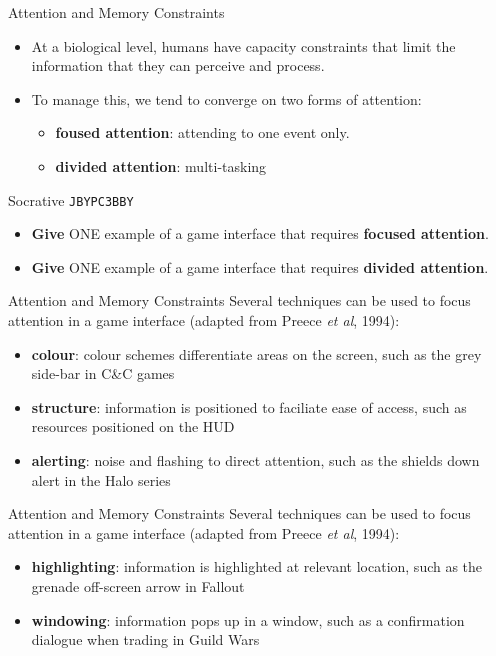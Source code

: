\begin{frame}{Attention and Memory Constraints}
	\begin{itemize}
		\item At a biological level, humans have capacity constraints that limit the information that they can perceive and process.
		\item To manage this, we tend to converge on two forms of attention:
		\begin{itemize}
			\item \textbf{foused attention}: attending to one event only.
			\item \textbf{divided attention}: multi-tasking
		\end{itemize}	
	\end{itemize}
\end{frame}

\begin{frame}[fragile]{Socrative \texttt{JBYPC3BBY}}
	\begin{itemize}
		\item \textbf{Give} ONE example of a game interface that requires \textbf{focused attention}.
		\item \textbf{Give} ONE example of a game interface that requires \textbf{divided attention}.
	\end{itemize}
\end{frame}

\begin{frame}{Attention and Memory Constraints}
	Several techniques can be used to focus attention in a game interface (adapted from Preece \textit{et al}, 1994):

	\begin{itemize}
		\item \textbf{colour}: colour schemes differentiate areas on the screen, such as the grey side-bar in C\&C games
		\item \textbf{structure}: information is positioned to faciliate ease of access, such as resources positioned on the HUD
		\item \textbf{alerting}: noise and flashing to direct attention, such as the shields down alert in the Halo series
	\end{itemize}
\end{frame}

\begin{frame}{Attention and Memory Constraints}
	Several techniques can be used to focus attention in a game interface (adapted from Preece \textit{et al}, 1994):

	\begin{itemize}
		\item \textbf{highlighting}: information is highlighted at  relevant location, such as the grenade off-screen arrow in Fallout
		\item \textbf{windowing}: information pops up in a window, such as a confirmation dialogue when trading in Guild Wars
	\end{itemize}
\end{frame}
